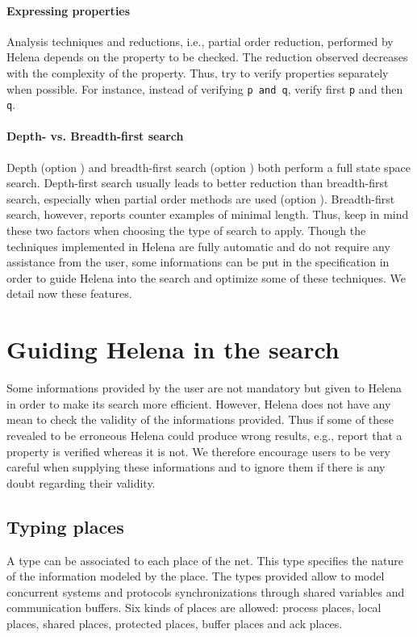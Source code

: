 \paragraph{Expressing properties}
Analysis techniques and reductions, i.e., partial order reduction,
performed by Helena depends on the property to be checked.  The
reduction observed decreases with the complexity of the property.
Thus, try to verify properties separately when possible.  For
instance, instead of verifying \lstinline{p and q}, verify first
\lstinline{p} and then \lstinline{q}.


\paragraph{Depth- vs. Breadth-first search}
Depth (option ) and breadth-first search (option
) both perform a full state space search.
Depth-first search usually leads to better reduction than
breadth-first search, especially when partial order methods are used
(option ).  Breadth-first search, however,
reports counter examples of minimal length.  Thus, keep in mind these
two factors when choosing the type of search to apply.  Though the
techniques implemented in Helena are fully automatic and do not
require any assistance from the user, some informations can be put in
the specification in order to guide Helena into the search and
optimize some of these techniques. We detail now these features.\\


\section{Guiding Helena in the search}
\label{sec:helping-helena}
Some informations provided by the user are not mandatory but given to
Helena in order to make its search more efficient.  However, Helena
does not have any mean to check the validity of the informations
provided.  Thus if some of these revealed to be erroneous Helena could
produce wrong results, e.g., report that a property is verified
whereas it is not.  We therefore encourage users to be very careful
when supplying these informations and to ignore them if there is any
doubt regarding their validity.

\subsection{Typing places}
A type can be associated to each place of the net. This type specifies
the nature of the information modeled by the place. The types provided
allow to model concurrent systems and protocols synchronizations through
shared variables and communication buffers. Six kinds of places are
allowed: process places, local places, shared places, protected
places, buffer places and ack places.

